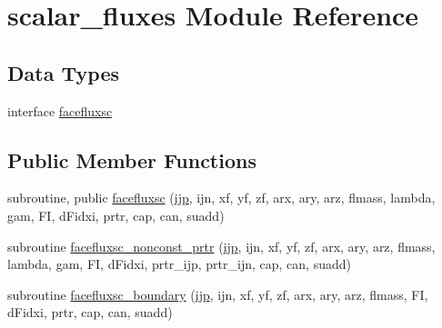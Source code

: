 \hypertarget{classscalar__fluxes}{\section{scalar\-\_\-fluxes Module Reference}
\label{classscalar__fluxes}
}
\subsection*{Data Types}
\begin{DoxyCompactItemize}
\item 
interface \hyperlink{interfacescalar__fluxes_1_1facefluxsc}{facefluxsc}
\end{DoxyCompactItemize}
\subsection*{Public Member Functions}
\begin{DoxyCompactItemize}
\item 
subroutine, public \hyperlink{classscalar__fluxes_a9bf68bb8b4ce0224ee86ed64331e4743}{facefluxsc} (\hyperlink{CourantNo_8h_accea320a458bb8759c7ece360e05ddf4}{ijp}, ijn, xf, yf, zf, arx, ary, arz, flmass, lambda, gam, F\-I, d\-Fidxi, prtr, cap, can, suadd)
\item 
subroutine \hyperlink{classscalar__fluxes_a0c1a70ddcbcfb6baab6b6c4c8b9cb9ca}{facefluxsc\-\_\-nonconst\-\_\-prtr} (\hyperlink{CourantNo_8h_accea320a458bb8759c7ece360e05ddf4}{ijp}, ijn, xf, yf, zf, arx, ary, arz, flmass, lambda, gam, F\-I, d\-Fidxi, prtr\-\_\-ijp, prtr\-\_\-ijn, cap, can, suadd)
\item 
subroutine \hyperlink{classscalar__fluxes_afd11c228ccf980ada366bbbbc0f890bc}{facefluxsc\-\_\-boundary} (\hyperlink{CourantNo_8h_accea320a458bb8759c7ece360e05ddf4}{ijp}, ijn, xf, yf, zf, arx, ary, arz, flmass, F\-I, d\-Fidxi, prtr, cap, can, suadd)
\end{DoxyCompactItemize}


